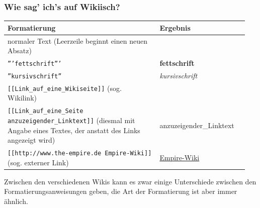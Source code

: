 \documentclass{beamer}
\begin{document}
\begin{frame}
  \frametitle{Wie sag’ ich’s auf Wikiisch?}
  
  \begin{tabular}{|p{0.60\linewidth}|p{0.35\linewidth}|}
    \toprule
    \textbf{Formatierung } & \textbf{Ergebnis } \\ 
    \midrule
     
    normaler Text\newline
    (Leerzeile beginnt einen neuen Absatz) & \\ 

    \midrule
 
    \texttt{'''fettschrift'''} & \textbf{fettschrift} \\ 

    \midrule
     
    \texttt{''kursivschrift''} & \emph{kursivschrift} \\ 

    \midrule
     
    \texttt{[[Link\_auf\_eine\_Wikiseite]]}\newline
    (sog. Wikilink) & \\ 

    \midrule
    
    \texttt{[[Link\_auf\_eine\_Seite anzuzeigender\_Linktext]]}\newline
    (diesmal mit Angabe eines Textes, der anstatt des Links angezeigt wird)
                           &  anzuzeigender\_Linktext \\ 

    \midrule
     
    \texttt{[[http://www.the-empire.de Empire-Wiki]]}\newline
    (sog. externer Link) & \href{http://www.the-empire.de}{Empire-Wiki} \\ 

    \bottomrule
  \end{tabular}
  
  Zwischen den verschiedenen Wikis kann es zwar einige Unterschiede zwischen den
  Formatierungsanweisungen geben, die Art der Formatierung ist aber immer
  ähnlich.
\end{frame}
\end{document}
